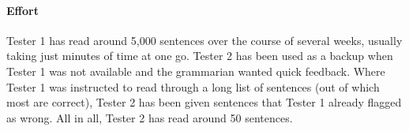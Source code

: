 \paragraph{Effort}

Tester 1 has read around 5,000 sentences over the course of several
weeks, usually taking just minutes of time at one go. Tester 2 has
been used as a backup when Tester 1 was not available and the
grammarian wanted quick feedback. Where Tester 1 was instructed to
read through a long list of sentences (out of which most are correct),
Tester 2 has been given sentences that Tester 1 already flagged as
wrong. All in all, Tester 2 has read around 50 sentences.
